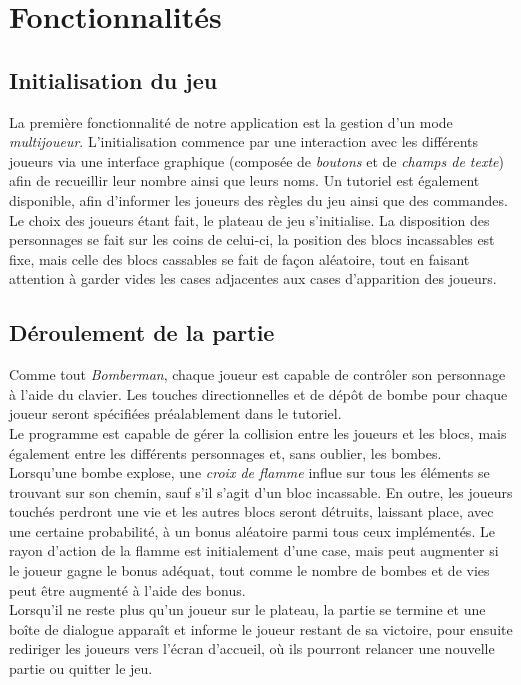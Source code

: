\newpage
\section{Fonctionnalités}
\subsection{Initialisation du jeu}
La première fonctionnalité de notre application est la gestion d'un mode \textit{multijoueur}. 
L'initialisation commence par une interaction avec les différents joueurs via une interface 
graphique (composée de \textit{boutons} et de \textit{champs de texte}) afin de recueillir leur 
nombre ainsi que leurs noms. Un tutoriel est également disponible, afin d'informer les joueurs 
des règles du jeu ainsi que des commandes.\\
Le choix des joueurs étant fait, le plateau de jeu s'initialise. La disposition des personnages 
se fait sur les coins de celui-ci, la position des blocs incassables est fixe, mais celle des 
blocs cassables se fait de façon aléatoire, tout en faisant attention à garder vides les cases adjacentes aux cases d'apparition des joueurs.

\subsection{Déroulement de la partie}
Comme tout \textit{Bomberman}, chaque joueur est capable de contrôler son personnage à l'aide 
du clavier. Les touches directionnelles et de dépôt de bombe pour chaque joueur seront spécifiées 
préalablement dans le tutoriel. \\
Le programme est capable de gérer la collision entre les joueurs et les blocs, mais également entre
les différents personnages et, sans oublier, les bombes.\\
Lorsqu'une bombe explose, une \textit{croix de flamme} influe sur tous les éléments se trouvant sur 
son chemin, sauf s'il s'agit d'un bloc incassable. En outre, les joueurs touchés perdront une vie 
et les autres blocs seront détruits, laissant place, avec une certaine probabilité, à un bonus aléatoire parmi tous ceux implémentés. Le rayon d'action de la flamme est initialement d'une case, 
mais peut augmenter si le joueur gagne le bonus adéquat, tout comme le nombre de bombes et de vies peut être augmenté à l'aide des bonus.\\
Lorsqu'il ne reste plus qu'un joueur sur le plateau, la partie se termine et  une boîte de dialogue apparaît et informe le joueur restant de sa victoire, pour 
ensuite rediriger les joueurs vers l'écran d'accueil, où ils pourront relancer une nouvelle partie ou quitter le jeu.

